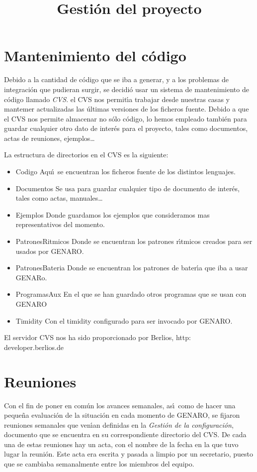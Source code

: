 \documentclass[a4paper,11pt]{article}
\title{Gesti\'on del proyecto}
\begin{document}
\maketitle
\tableofcontents
\section{Mantenimiento del c\'odigo}

Debido a la cantidad de c\'odigo que se iba a generar, y a los problemas de integraci\'on que pudieran surgir, se decidi\'o usar un sistema de mantenimiento de c\'odigo llamado \emph{CVS}. el CVS nos permit\'\i a trabajar desde nuestras casas y mantemer actualizadas las \'ultimas versiones de los ficheros fuente. Debido a que el CVS nos permite almacenar no s\'olo c\'odigo, lo hemos empleado tambi\'en para guardar cualquier otro dato de inter\'es para el proyecto, tales como documentos, actas de reuniones, ejemplos\dots

La estructura de directorios en el CVS es la siguiente:
\begin {itemize}
\item [Codigo] Aqu\'\i ~se encuentran los ficheros fuente de los distintos lenguajes.
\item [Documentos] Se usa para guardar cualquier tipo de documento de inter\'es, tales como actas, manuales\dots
\item [Ejemplos] Donde guardamos los ejemplos que consideramos mas representativos del momento.
\item [PatronesRitmicos] Donde se encuentran los patrones r\'\i tmicos creados para ser usados por GENARO.
\item [PatronesBateria] Donde se encuentran los patrones de bater\'\i a que iba a usar GENARo.
\item [ProgramasAux] En el que se han guardado otros programas que se usan con GENARO
\item [Timidity] Con el timidity configurado para ser invocado por GENARO.
\end {itemize}

El servidor CVS nos ha sido proporcionado por Berlios, http:\\developer.berlios.de

\section{Reuniones}

Con el fin de poner en com\'un los avances semanales, as\'\i ~como de hacer una peque\~na evaluaci\'on de la situaci\'on en cada momento de GENARO, se fijaron reuniones semanales que ven\'\i an definidas en la \emph{Gesti\'on de la configuraci\'on}, documento que se encuentra en su correspondiente directorio del CVS. De cada una de estas reuniones hay un acta, con el nombre de la fecha en la que tuvo lugar la reuni\'on. Este acta era escrita y pasada a limpio por un secretario, puesto que se cambiaba semanalmente entre los miembros del equipo.
\end{document}
